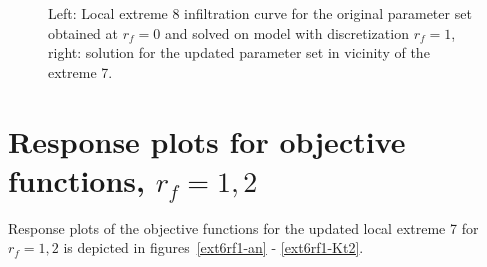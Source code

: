 \documentclass[review,times,3p,10pt]{elsarticle}
\begin{document}
\begin{figure}
\label{rf0rf1img2}
\caption{Left: Local extreme 8 infiltration curve for the original parameter set obtained at $r_f=0$ and solved on model with discretization $r_f=1$, right: solution for the updated parameter set in  vicinity of the extreme 7.}
\end{figure}

\section{Response plots for objective functions, $r_f=1,2$}

Response plots of the objective functions for the updated local extreme 7 for $r_f=1,2$ is depicted in figures~\ref{ext6rf1-an} - \ref{ext6rf1-Kt2}.
\end{document}
